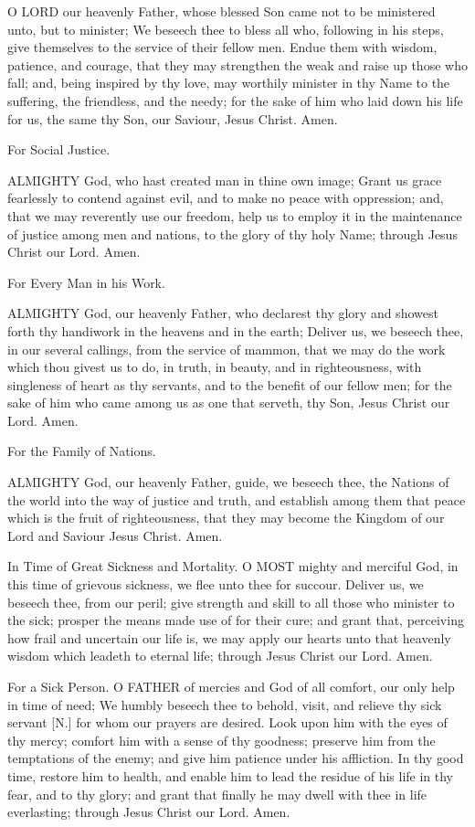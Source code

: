 O LORD our heavenly Father, whose blessed Son came not to be ministered unto, but to minister; We beseech thee to bless all who, following in his steps, give themselves to the service of their fellow men. Endue them with wisdom, patience, and courage, that they may strengthen the weak and raise up those who fall; and, being inspired by thy love, may worthily minister in thy Name to the suffering, the friendless, and the needy; for the sake of him who laid down his life for us, the same thy Son, our Saviour, Jesus Christ. Amen.

For Social Justice.

ALMIGHTY God, who hast created man in thine own image; Grant us grace fearlessly to contend against evil, and to make no peace with oppression; and, that we may reverently use our freedom, help us to employ it in the maintenance of justice among men and nations, to the glory of thy holy Name; through Jesus Christ our Lord. Amen.

For Every Man in his Work.

ALMIGHTY God, our heavenly Father, who declarest thy glory and showest forth thy handiwork in the heavens and in the earth; Deliver us, we beseech thee, in our several callings, from the service of mammon, that we may do the work which thou givest us to do, in truth, in beauty, and in righteousness, with singleness of heart as thy servants, and to the benefit of our fellow men; for the sake of him who came among us as one that serveth, thy Son, Jesus Christ our Lord. Amen.

For the Family of Nations.

ALMIGHTY God, our heavenly Father, guide, we beseech thee, the Nations of the world into the way of justice and truth, and establish among them that peace which is the fruit of righteousness, that they may become the Kingdom of our Lord and Saviour Jesus Christ. Amen.
 

 
In Time of Great Sickness and Mortality.
O MOST mighty and merciful God, in this time of grievous sickness, we flee unto thee for succour. Deliver us, we beseech thee, from our peril; give strength and skill to all those who minister to the sick; prosper the means made use of for their cure; and grant that, perceiving how frail and uncertain our life is, we may apply our hearts unto that heavenly wisdom which leadeth to eternal life; through Jesus Christ our Lord. Amen.

For a Sick Person.
O FATHER of mercies and God of all comfort, our only help in time of need; We humbly beseech thee to behold, visit, and relieve thy sick servant [N.] for whom our prayers are desired. Look upon him with the eyes of thy mercy; comfort him with a sense of thy goodness; preserve him from the temptations of the enemy; and give him patience under his affliction. In thy good time, restore him to health, and enable him to lead the residue of his life in thy fear, and to thy glory; and grant that finally he may dwell with thee in life everlasting; through Jesus Christ our Lord. Amen.

